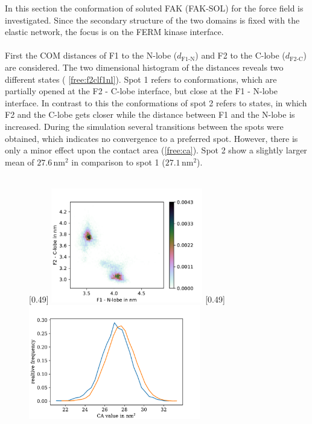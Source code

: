 In this section the conformation of soluted FAK (FAK-SOL) for the \martini force field is investigated. Since the secondary structure of the two domains is fixed with the elastic network, the focus is on the FERM kinase interface.\\
\\
First the COM distances of F1 to the N-lobe ($d_\text{F1-N}$) and F2 to the C-lobe ($d_\text{F2-C}$) are considered. The two dimensional histogram of the distances reveals two different states ( \autoref{free:f2clf1nl}). Spot 1 refers to conformations, which are partially opened at the F2 - C-lobe interface, but close at the F1 - N-lobe interface. In contrast to this the conformations of spot 2 refers to states, in which F2 and the C-lobe gets closer while the distance between F1 and the N-lobe is increased. During the simulation several transitions between the spots were obtained, which indicates no convergence to a preferred spot. However, there is only a minor effect upon the contact area (\autoref{free:ca}).  Spot 2 show a slightly larger mean of $27.6\,\si{\nano\metre}^2$ in comparison to spot 1 ($27.1\,\si{\nano\metre}^2$).\\
\\
%
%
%
\begin{figure}
	\subcaptionbox{\label{free:f2clf1nl}}[0.49\textwidth]{
		\includegraphics[height=5cm]{figures/results/free_f1f2}
	}\hfill%
	\subcaptionbox{\label{free:ca}}[0.49\textwidth]{
		\includegraphics[height=5cm]{figures/results/free_ca}
	}%
\end{figure}

